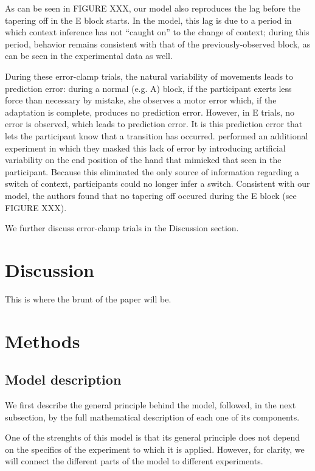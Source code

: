 \documentclass[a4paper,doc,floatsintext,natbib]{apa6}
\begin{document}
As can be seen in FIGURE XXX, our model also reproduces the lag before the tapering off in the E block starts. In the model, this lag is due to a period in which context inference has not ``caught on'' to the change of context; during this period, behavior remains consistent with that of the previously-observed block, as can be seen in the experimental data as well.

During these error-clamp trials, the natural variability of movements leads to prediction error: during a normal (e.g. A) block, if the participant exerts less force than necessary by mistake, she observes a motor error which, if the adaptation is complete, produces no prediction error. However, in E trials, no error is observed, which leads to prediction error. It is this prediction error that lets the participant know that a transition has occurred. \cite{Vaswani_Decay_2013} performed an additional experiment in which they masked this lack of error by introducing artificial variability on the end position of the hand that mimicked that seen in the participant. Because this eliminated the only source of information regarding a switch of context, participants could no longer infer a switch. Consistent with our model, the authors found that no tapering off occured during the E block (see FIGURE XXX).

We further discuss error-clamp trials in the Discussion section.


\section{Discussion}
This is where the brunt of the paper will be.


\section{Methods}
\subsection{Model description}
\label{subsection:model-description}
We first describe the general principle behind the model, followed, in the next
subsection, by the full mathematical description of each one of its components.

One of the strenghts of this model is that its general principle does not
depend on the specifics of the experiment to which it is applied. However, for
clarity, we will connect the different parts of the model to different
experiments.
\end{document}
